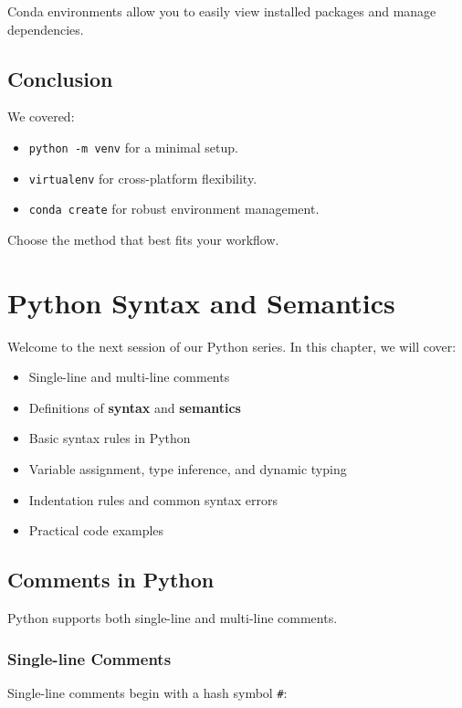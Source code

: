 \begin{noteBox}
Conda environments allow you to easily view installed packages and manage dependencies.
\end{noteBox}

\section{Conclusion}
We covered:
\begin{itemize}
    \item \texttt{python -m venv} for a minimal setup.
    \item \texttt{virtualenv} for cross-platform flexibility.
    \item \texttt{conda create} for robust environment management.
\end{itemize}
Choose the method that best fits your workflow.

\chapter{Python Syntax and Semantics}

Welcome to the next session of our Python series.  
In this chapter, we will cover:

\begin{itemize}
    \item Single-line and multi-line comments
    \item Definitions of \textbf{syntax} and \textbf{semantics}
    \item Basic syntax rules in Python
    \item Variable assignment, type inference, and dynamic typing
    \item Indentation rules and common syntax errors
    \item Practical code examples
\end{itemize}

\section{Comments in Python}

Python supports both single-line and multi-line comments.

\subsection{Single-line Comments}

Single-line comments begin with a hash symbol \texttt{\#}:

